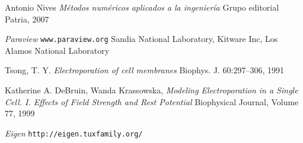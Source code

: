 \begin{thebibliography}{99}
	Antonio Nives
	\emph{Métodos numéricos aplicados a la ingeniería}
	Grupo editorial Patria,
	2007

	\emph{Paraview}
	\texttt{www.paraview.org}
	Sandia National Laboratory, Kitware Inc, Los Alamos National Laboratory


	Tsong, T. Y.
	\emph{Electroporation of cell membranes}
	Biophys. J. 60:297–306, 1991

	Katherine A. DeBruin, Wanda Krassowska, 
	\emph{Modeling Electroporation in a Single Cell. I. Effects of Field Strength and
Rest Potential}
	Biophysical Journal, Volume 77, 1999
	
	\emph{Eigen}
	\texttt{http://eigen.tuxfamily.org/}
	
\end{thebibliography}
